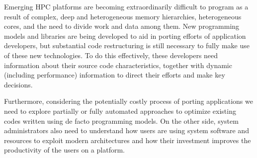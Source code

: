 Emerging HPC platforms are becoming extraordinarily difficult to program as a result of complex, deep and heterogeneous memory hierarchies, heterogeneous cores, and the need to divide work and data among them.
New programming models and libraries are being developed to aid in porting efforts of application developers, but substantial code restructuring is still necessary to fully make use of these new technologies.
To do this effectively, these developers need information about their source code characteristics, together with dynamic (including performance) information to direct their efforts and make key decisions.



Furthermore, considering the potentially costly process of porting applications we need to explore partially or fully automated approaches to optimize existing codes written using de facto programming models.
On the other side, system administrators also need to understand how users are using system software and resources to exploit modern architectures and how their investment improves the productivity of the users on a platform.

